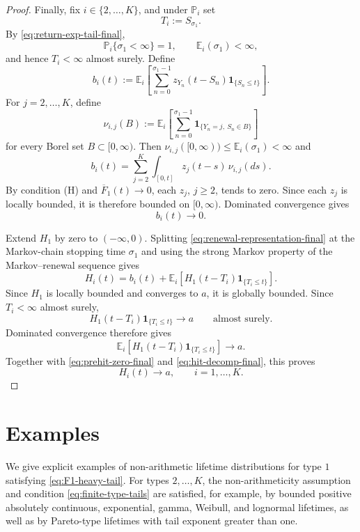 \documentclass[reqno,final,11pt]{amsart}
\newcommand{\E}{\mathbb E}
\newcommand{\Pbb}{\mathbb P}
\newcommand{\ind}[1]{\mathbf 1_{\{#1\}}}
\theoremstyle{plain}
\theoremstyle{definition}
\theoremstyle{remark}
\numberwithin{equation}{section}
\begin{document}
\begin{proof}
Finally, fix \(i\in\{2,\dots,K\}\), and under \(\Pbb_i\) set
\[
  T_i:=S_{\sigma_1}.
\]
By \eqref{eq:return-exp-tail-final},
\[
  \Pbb_i\{\sigma_1<\infty\}=1,
  \qquad
  \E_i(\sigma_1)<\infty,
\]
and hence \(T_i<\infty\) almost surely. Define
\[
  b_i(t):=
  \E_i\left[
    \sum_{n=0}^{\sigma_1-1}
    z_{Y_n}(t-S_n)\ind{S_n\le t}
  \right].
\]
For \(j=2,\dots,K\), define
\[
  \nu_{i,j}(B):=
  \E_i\left[
    \sum_{n=0}^{\sigma_1-1}
    \ind{Y_n=j,\ S_n\in B}
  \right]
\]
for every Borel set \(B\subset[0,\infty)\). Then
\(
  \nu_{i,j}([0,\infty))
  \le
  \E_i(\sigma_1)
  <\infty
\)
and
\[
  b_i(t)
  =
  \sum_{j=2}^K
  \int_{[0,t]}z_j(t-s)\,\nu_{i,j}(ds).
\]
By condition \textup{(H)} and \(\overline F_1(t)\to0\), each \(z_j\), \(j\ge2\), tends to zero. Since each \(z_j\) is locally bounded, it is therefore bounded on \([0,\infty)\). Dominated convergence gives
\begin{equation}\label{eq:prehit-zero-final}
  b_i(t)\longrightarrow0.
\end{equation}

Extend \(H_1\) by zero to \((-\infty,0)\). Splitting \eqref{eq:renewal-representation-final} at the Markov-chain stopping time \(\sigma_1\) and using the strong Markov property of the Markov--renewal sequence gives
\begin{equation}\label{eq:hit-decomp-final}
  H_i(t)
  =
  b_i(t)
  +
  \E_i\left[
    H_1(t-T_i)\ind{T_i\le t}
  \right].
\end{equation}
Since \(H_1\) is locally bounded and converges to \(a\), it is globally bounded. Since \(T_i<\infty\) almost surely,
\[
  H_1(t-T_i)\ind{T_i\le t}
  \longrightarrow a
  \qquad\text{almost surely}.
\]
Dominated convergence therefore gives
\[
  \E_i\left[
    H_1(t-T_i)\ind{T_i\le t}
  \right]
  \longrightarrow a.
\]
Together with \eqref{eq:prehit-zero-final} and \eqref{eq:hit-decomp-final}, this proves
\[
  H_i(t)\longrightarrow a,
  \qquad i=1,\dots,K.
\]
\end{proof}

\section{Examples}\label{sec:examples}

We give explicit examples of non-arithmetic lifetime distributions for type \(1\) satisfying \eqref{eq:F1-heavy-tail}. For types \(2,\dots,K\), the non-arithmeticity assumption and condition \eqref{eq:finite-type-tails} are satisfied, for example, by bounded positive absolutely continuous, exponential, gamma, Weibull, and lognormal lifetimes, as well as by Pareto-type lifetimes with tail exponent greater than one.
\end{document}

